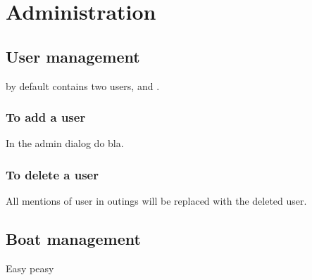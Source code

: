 \chapter{Administration}
\section{User management}
\srl by default contains two users,  and .
\subsection{To add a user}
In the admin dialog do bla.
\subsection{To delete a user}
All mentions of user in outings will be replaced with the deleted user.
\section{Boat management}
Easy peasy
